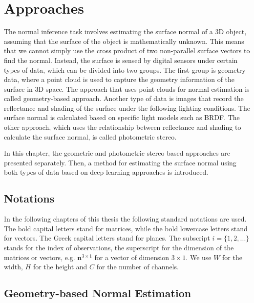 \chapter{Approaches} %

\label{ch:03} %

The normal inference task involves estimating the surface normal of a 3D object, assuming that the surface of the object is mathematically unknown. This means that we cannot simply use the cross product of two non-parallel surface vectors to find the normal. Instead, the surface is sensed by digital sensors under certain types of data, which can be divided into two groups. The first group is geometry data, where a point cloud is used to capture the geometry information of the surface in 3D space. The approach that uses point clouds for normal estimation is called geometry-based approach.
Another type of data is images that record the reflectance and shading of the surface under the following lighting conditions. The surface normal is calculated based on specific light models such as BRDF. The other approach, which uses the relationship between reflectance and shading to calculate the surface normal, is called photometric stereo.

In this chapter, the geometric and photometric stereo based approaches are presented separately. Then, a method for estimating the surface normal using both types of data based on deep learning approaches is introduced.





\section{Notations}

In the following chapters of this thesis the following standard notations are used. The bold capital letters stand for matrices, while the bold lowercase letters stand for vectors. The Greek capital letters stand for planes.
The subscript $ i= \{1,2,...\} $ stands for the index of observations, the superscript for the dimension of the matrices or vectors, e.g. $ \textbf{n}^{3\times 1} $ for a vector of dimension $ 3\times 1 $. We use $ W $ for the width, $ H $ for the height and $ C $ for the number of channels.


\section{Geometry-based Normal Estimation}


